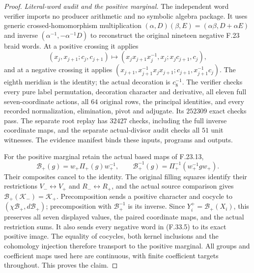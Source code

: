 \begin{proof}
\emph{Literal-word audit and the positive marginal.}
The independent word verifier imports
no producer arithmetic and no symbolic
algebra package. It uses generic
crossed-homomorphism multiplication
$(\alpha,D)(\beta,E)=(\alpha\beta,D+\alpha E)$
and inverse $(\alpha^{-1},-\alpha^{-1}D)$
to reconstruct the original nineteen
negative F.23 braid words.
At a positive crossing it applies
\[
 (x_j,x_{j+1};c_j,c_{j+1})\longmapsto
 (x_jx_{j+1}x_j^{-1},x_j;x_jc_{j+1},c_j),
                                                               \tag{F.33.18}
\]
and at a negative crossing it applies
$(x_{j+1},x_{j+1}^{-1}x_jx_{j+1};
c_{j+1},x_{j+1}^{-1}c_j)$.
The eighth meridian is the identity;
the actual decoration is $c_8^{-1}$.
The verifier checks every pure label
permutation, decoration character and
derivative, all eleven full seven-coordinate
actions, all $64$ original rows, the
principal identities, and every recorded
normalization, elimination, pivot and
adjugate. Its $252309$ exact checks pass.
The separate root replay has $32427$
checks, including the full inverse
coordinate maps, and the separate
actual-divisor audit checks all $51$
unit witnesses. The evidence manifest
binds these inputs, programs and outputs.

For the positive marginal retain the
actual based maps of F.23.13,
\[
 \mathcal B_+(g)=w_+\Pi_+(g)w_+^{-1},\qquad
 \mathcal B_+^{-1}(g)=\Pi_+^{-1}(w_+^{-1}gw_+).
                                                               \tag{F.33.19}
\]
Their composites cancel to the identity.
The original filling squares identify
their restrictions $V_-\leftrightarrow V_+$
and $R_-\leftrightarrow R_+$, and the
actual source comparison gives
$\mathcal B_+(\mathcal K_-)=\mathcal K_+$.
Precomposition sends a positive character
and cocycle to
$(\chi\mathcal B_+,d\mathcal B_+)$;
precomposition with $\mathcal B_+^{-1}$
is its inverse. Since $Y_i^+=\mathcal B_+(X_i)$,
this preserves all seven displayed
values, the paired coordinate maps,
and the actual restriction sums.
It also sends every negative word in
(F.33.5) to its exact positive image.
The equality of cocycles, both kernel
inclusions and the cohomology injection
therefore transport to the positive
marginal. All groups and coefficient
maps used here are continuous, with
finite coefficient targets throughout.
This proves the claim.
\end{proof}
